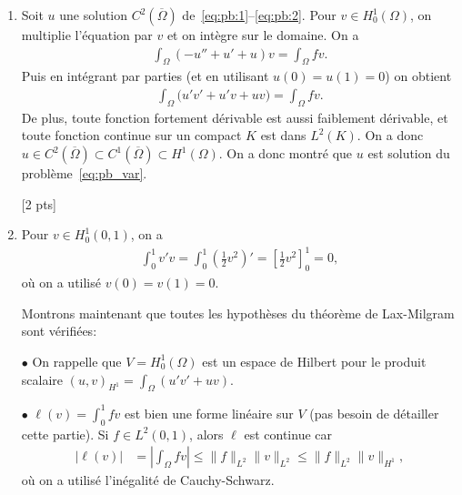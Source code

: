 \documentclass[12pt]{article}
\begin{document}
\newpage


\begin{cor} $\quad$
  \\
  \begin{enumerate}
  \item Soit $u$ une solution $C^2(\overline{\Omega})$ de~\eqref{eq:pb:1}--\eqref{eq:pb:2}.
    Pour $v \in H^1_0(\Omega)$, on multiplie l'\'equation par $v$ et on int\`egre sur le domaine.
    On a
    \begin{align*}
      \int_{\Omega} (-u'' + u' + u) v = \int_{\Omega} f v .
    \end{align*}
    Puis en int\'egrant par parties (et en utilisant $u(0) = u(1) = 0$) on obtient
    \begin{align*}
      \int_{\Omega} \Big( u' v' + u' v + u v \Big) = \int_{\Omega} f v .
    \end{align*}
    De plus, toute fonction fortement d\'erivable est aussi faiblement d\'erivable,
    et toute fonction continue sur un compact $K$ est dans $L^2(K)$.
    On a donc $u \in C^2(\overline{\Omega}) \subset C^1(\overline{\Omega}) \subset H^1(\Omega)$.
    On a donc montr\'e que $u$ est solution du probl\`eme~\eqref{eq:pb_var}.
    
    [2 pts]
  \item
    Pour $v \in H^1_0(0,1)$, on a
    \begin{align*}
      \int_0^1 v' v = \int_0^1 \left(\frac12 v^2 \right)' = \left[\frac12 v^2 \right]_0^1 = 0 ,
    \end{align*}
    o\`u on a utilis\'e $v(0) = v(1) = 0$.


    Montrons maintenant que toutes les hypoth\`eses du th\'eor\`eme de Lax-Milgram sont v\'erifi\'ees:

    $\bullet$ On rappelle que $V = H_0^1(\Omega)$ est un espace de Hilbert
    pour le produit scalaire $(u,v)_{H^1} = \int_{\Omega} (u'v' + u v)$.

    $\bullet$ $\ell(v) = \int_0^1 fv$ est bien une forme lin\'eaire sur $V$
    (pas besoin de d\'etailler cette partie).
    Si $f \in L^2(0,1)$, alors $\ell$ est continue car
    \begin{align*}
      | \ell(v) |
      &= \left| \int_{\Omega} f v \right| \leq \| f \|_{L^2} \| v \|_{L^2}
        \leq \| f \|_{L^2} \| v \|_{H^1} ,
    \end{align*}
    o\`u on a utilis\'e l'in\'egalit\'e de Cauchy-Schwarz.



\end{enumerate}
\end{cor}
\end{document}
